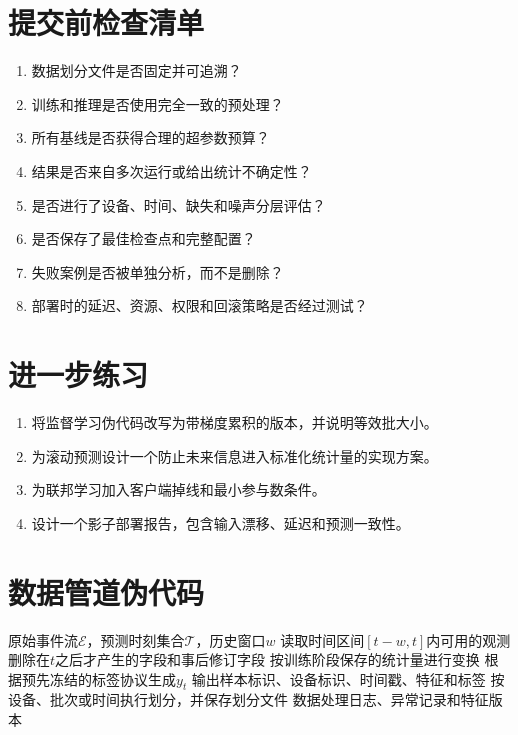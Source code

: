 \section{提交前检查清单}
\begin{enumerate}[label=\arabic*.]
 \item 数据划分文件是否固定并可追溯？
 \item 训练和推理是否使用完全一致的预处理？
 \item 所有基线是否获得合理的超参数预算？
 \item 结果是否来自多次运行或给出统计不确定性？
 \item 是否进行了设备、时间、缺失和噪声分层评估？
 \item 是否保存了最佳检查点和完整配置？
 \item 失败案例是否被单独分析，而不是删除？
 \item 部署时的延迟、资源、权限和回滚策略是否经过测试？
\end{enumerate}

\section{进一步练习}
\begin{enumerate}[label=\arabic*.]
 \item 将监督学习伪代码改写为带梯度累积的版本，并说明等效批大小。
 \item 为滚动预测设计一个防止未来信息进入标准化统计量的实现方案。
 \item 为联邦学习加入客户端掉线和最小参与数条件。
 \item 设计一个影子部署报告，包含输入漂移、延迟和预测一致性。
\end{enumerate}

\section{数据管道伪代码}
\begin{algorithm}[htbp]
\caption{带时间边界的数据准备}
\begin{algorithmic}[1]
\Require 原始事件流$\mathcal{E}$，预测时刻集合$\mathcal{T}$，历史窗口$w$
 \State 读取时间区间$[t-w,t]$内可用的观测
 \State 删除在$t$之后才产生的字段和事后修订字段
 \State 按训练阶段保存的统计量进行变换
 \State 根据预先冻结的标签协议生成$y_t$
 \State 输出样本标识、设备标识、时间戳、特征和标签
\EndFor
\State 按设备、批次或时间执行划分，并保存划分文件
\Ensure 数据处理日志、异常记录和特征版本
\end{algorithmic}
\end{algorithm}

